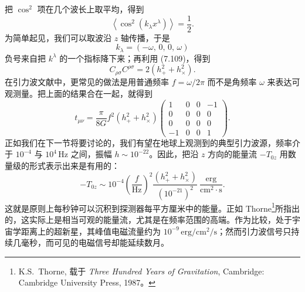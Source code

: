 


把 $\cos^2$ 项在几个波长上取平均，得到
\begin{equation*}
\left\langle \cos^2(k_\lambda x^\lambda) \right\rangle = \frac{1}{2}.
\tag{7.168}
\end{equation*}
为简单起见，我们可以取波沿 $z$ 轴传播，于是
\begin{equation*}
k_\lambda = \left(-\omega,\, 0,\, 0,\, \omega\right)
\tag{7.169}
\end{equation*}
负号来自把 $k^\lambda$ 的一个指标降下来；再利用 (7.109)，得到
\begin{equation*}
C_{\rho\sigma}C^{\rho\sigma} = 2(h_+^2 + h_\times^2).
\tag{7.170}
\end{equation*}
在引力波文献中，更常见的做法是用普通频率 $f = \omega/2\pi$ 而不是角频率 $\omega$ 来表达可观测量。把上面的结果合在一起，就得到
\begin{equation*}
t_{\mu\nu} = \frac{\pi}{8G}f^2(h_+^2 + h_\times^2)
\begin{pmatrix}
1 & 0 & 0 & -1 \\
0 & 0 & 0 & 0 \\
0 & 0 & 0 & 0 \\
-1 & 0 & 0 & 1
\end{pmatrix}.
\tag{7.171}
\end{equation*}
正如我们在下一节将要讨论的，我们有望在地球上观测到的典型引力波源，频率介于 $10^{-4}$ 与 $10^4\,\mathrm{Hz}$ 之间，振幅 $h \sim 10^{-22}$。因此，把沿 $z$ 方向的能量流 $-T_{0z}$ 用数量级的形式表示出来是有用的：
\begin{equation*}
-T_{0z} \sim 10^{-4}\left(\frac{f}{\mathrm{Hz}}\right)^{2}\frac{\left(h_+^2 + h_\times^2\right)}{\left(10^{-21}\right)^{2}}\ \frac{\mathrm{erg}}{\mathrm{cm}^2\cdot\mathrm{s}}.
\tag{7.172}
\end{equation*}
这就是原则上每秒钟可以沉积到探测器每平方厘米中的能量。正如 Thorne\footnote{K.S.~Thorne, 载于 \emph{Three Hundred Years of Gravitation}, Cambridge: Cambridge University Press, 1987。}所指出的，这实际上是相当可观的能量流，尤其是在频率范围的高端。作为比较，处于宇宙学距离上的超新星，其峰值电磁流量约为 $10^{-9}\,\mathrm{erg/cm^2/s}$；然而引力波信号只持续几毫秒，而可见的电磁信号却能延续数月。

